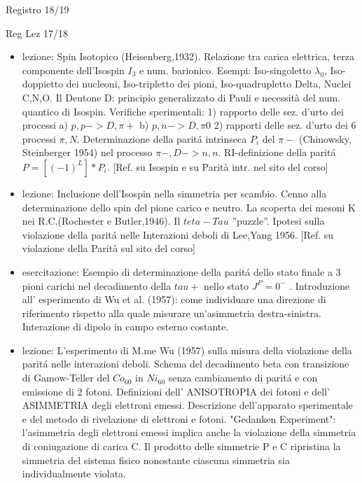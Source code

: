 \begin{frame}{Registro 18/19}
\begin{frame}[allowframebreaks]{Reg Lez 17/18}
\begin{itemize}
\item lezione: Spin Isotopico (Heisenberg,1932). Relazione tra carica elettrica, terza componente dell'Isospin $I_3$ e num. barionico. Esempi: Iso-singoletto $\lambda_0$, Iso-doppietto dei nucleoni, Iso-tripletto dei pioni, Iso-quadrupletto Delta, Nuclei C,N,O. Il Deutone D: principio generalizzato di Pauli e necessità del num. quantico di Isospin. Verifiche sperimentali: 1) rapporto delle sez. d'urto dei processi a) $p,p->D,\pi+$ b) $p,n->D,\pi0$ 2) rapporti delle sez. d'urto dei 6 processi $\pi,N$. Determinazione della parit\'a intrinseca $P_i$ del $\pi-$ (Chinowsky, Steinberger 1954) nel processo $\pi-,D->n,n$. RI-definizione della parit\'a $P=[(-1)^L]*P_i$. [Ref. su Isospin e su Parità intr. nel sito del corso]

\item lezione: Inclusione dell'Isospin nella simmetria per scambio. Cenno alla determinazione dello spin del pione carico e neutro. La scoperta dei mesoni K nei R.C.(Rochester e Butler,1946). Il $teta-Tau$ ''puzzle''. Ipotesi sulla violazione della parit\'a nelle Interazioni deboli di Lee,Yang 1956. [Ref. su violazione della Parità sul sito del corso]

\item esercitazione: Esempio di determinazione della parit\'a dello stato finale a 3 pioni carichi nel decadimento della $tau+$ nello stato $J^P=0^-$ . Introduzione all' esperimento di Wu et al. (1957): come individuare una direzione di riferimento rispetto alla quale misurare un'asimmetria destra-sinistra. Interazione di dipolo in campo esterno costante.

\item lezione: L'esperimento di M.me Wu (1957) sulla misura della violazione della parit\'a nelle interazioni deboli. Schema del decadimento beta con transizione di Gamow-Teller del $Co_{60}$ in $Ni_{60}$ senza cambiamento di parit\'a e con emissione di 2 fotoni. Definizioni dell' ANISOTROPIA dei fotoni e dell' ASIMMETRIA degli elettroni emessi. Descrizione dell'apparato sperimentale e del metodo di rivelazione di elettroni e fotoni. "Gedanken Experiment": l'asimmetria degli elettroni emessi implica anche la violazione della simmetria di coniugazione di carica C. Il prodotto delle simmetrie P e C ripristina la simmetria del sistema fisico nonostante ciascuna simmetria sia individualmente violata.


\end{itemize}
\end{frame}
\end{frame}
